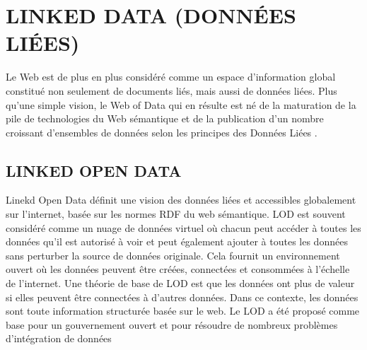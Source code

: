 \documentclass[12pt]{report}
\begin{document}
\section{LINKED DATA (DONNÉES LIÉES)}
Le Web est de plus en plus considéré comme un espace d’information global constitué non seulement de documents liés, mais aussi de données liées. Plus qu’une simple vision, le Web of Data qui en résulte est né de la maturation de la pile de technologies du Web sémantique et de la publication d’un nombre croissant d’ensembles de données selon les principes des Données Liées
\cite{LDOW}.
\subsection{LINKED OPEN DATA}
Linekd Open Data définit une vision des données liées et accessibles globalement sur l'internet, basée sur
les normes RDF du web sémantique. LOD est souvent considéré comme un nuage de données virtuel où
chacun peut accéder à toutes les données qu'il est autorisé à voir et peut également ajouter à toutes les
données sans perturber la source de données originale. Cela fournit un environnement ouvert où les
données peuvent être créées, connectées et consommées à l'échelle de l'internet. Une théorie de base de
LOD est que les données ont plus de valeur si elles peuvent être connectées à d'autres données. Dans ce
contexte, les données sont toute information structurée basée sur le web.
Le LOD a été proposé comme base pour un gouvernement ouvert et pour résoudre de nombreux
problèmes d'intégration de données
\end{document}
